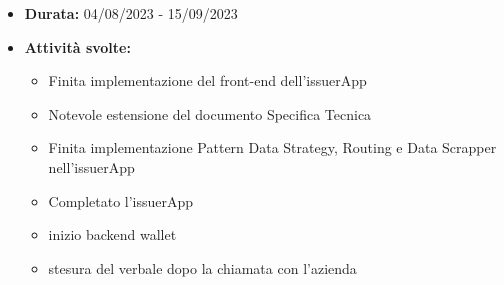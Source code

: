         \begin{itemize}
            \item \textbf{Durata:} 04/08/2023 - 15/09/2023 
            \item \textbf{Attività svolte:}
            \begin{itemize}
                \item Finita implementazione del front-end dell’issuerApp
                \item Notevole estensione del documento Specifica Tecnica
                \item Finita implementazione Pattern Data Strategy, Routing e Data Scrapper nell’issuerApp
                \item Completato l’issuerApp 
                \item inizio backend wallet
                \item stesura del verbale dopo la chiamata con l’azienda
                

\end{itemize}
\end{itemize}
